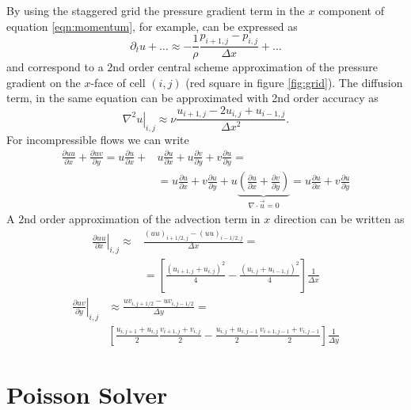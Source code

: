 \documentclass[a4paper,11pt]{report}
\begin{document}
By using the staggered grid the pressure gradient term in the $x$ component of equation \eqref{eqn:momentum}, for example, can be expressed as
\begin{equation*}
    \partial_t u + \dots \approx -\frac{1}{\rho}\frac{p_{i+1,j} - p_{i,j}}{\Delta x} + \dots
\end{equation*}
and correspond to a 2nd order central scheme approximation of the pressure gradient on the $x$-face of cell $(i,j)$ (red square in figure \ref{fig:grid}). The diffusion term, in the same equation can be approximated with 2nd order accuracy as
\begin{equation*}
    \left . \nabla^2 u \right |_{i,j} \approx \nu \frac{u_{i+1,j} - 2u_{i,j} + u_{i-1,j}}{\Delta x^2}.
\end{equation*}
For incompressible flows we can write
\begin{equation*}
    \begin{aligned}
        \frac{\partial uu}{\partial x} + \frac{\partial uv}{\partial y} = u\frac{\partial u}{\partial x} + &u\frac{\partial u}{\partial x} + u\frac{\partial v}{\partial y} + v\frac{\partial u}{\partial y} = \\ 
        & = u\frac{\partial u}{\partial x} + v\frac{\partial u}{\partial y} + u\underbrace{\left(\frac{\partial u}{\partial x} + 
        \frac{\partial v}{\partial y}\right)}_{\nabla \cdot \vec{u} = 0} = u\frac{\partial u}{\partial x} + v\frac{\partial u}{\partial y}
    \end{aligned}
\end{equation*}
A 2nd order approximation of the advection term in $x$ direction can be written as
\begin{equation*}
    \begin{aligned}
        \left . \frac{\partial uu}{\partial x}\right |_{i,j} \approx& \frac{\left(uu\right)_{i+1/2,j} - \left(uu\right)_{i-1/2,j}}{\Delta x} = \\
        & = \left[\frac{\left(u_{i+1,j} + u_{i,j}\right)^2}{4} - \frac{\left(u_{i,j} + u_{i-1,j}\right)^2}{4}\right]\frac{1}{\Delta x}
    \end{aligned}
\end{equation*}
\begin{equation*}
    \begin{aligned}        
        \left . \frac{\partial uv}{\partial y}\right |_{i,j} &\approx \frac{uv_{i,j+1/2} - uv_{i,j-1/2}}{\Delta y} = \\
        &\left[\frac{u_{i,j+1} + u_{i,j}}{2}\frac{v_{i+1,j} + v_{i,j}}{2} - \frac{u_{i,j} + u_{i,j-1}}{2}\frac{v_{i+1,j-1} + v_{i,j-1}}{2} \right]\frac{1}{\Delta y}
    \end{aligned}
\end{equation*}

\section*{Poisson Solver}
\end{document}
